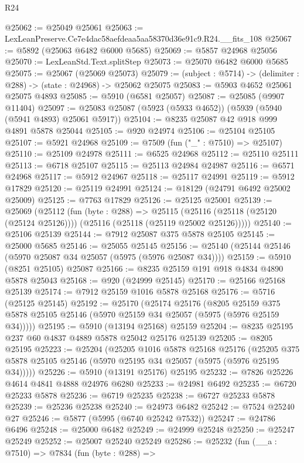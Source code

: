 \begin{lexlean}{R24}
\begin{coremodule}
@25062 := @25049 @25061
@25063 := LexLeanPreserve.Ce7e4dac58aefdeaa5aa58370d36e91c9.R24.__fits_108
@25067 := @5892 (@25063 @6482 @6000 @5685)
@25069 := @5857 @24968 @25056
@25070 := LexLeanStd.Text.splitStep
@25073 := @25070 @6482 @6000 @5685
@25075 := @25067 (@25069 @25073)
@25079 := (subject : @5714) -> (delimiter : @288) -> (state : @24968) -> @25062 @25075
@25083 := @5903 @4652 @25061 @25075 @4893
@25085 := @5910 (@6581 @25057)
@25087 := @25085 (@9907 @11404)
@25097 := @25083 @25087 (@5923 (@5933 @4652)) (@5939 (@5940 (@5941 @4893) @25061 @5917))
@25104 := @8235 @25087 @42 @918 @999 @4891 @5878 @25044
@25105 := @920 @24974
@25106 := @25104 @25105
@25107 := @5921 @24968
@25109 := @7509 (fun ("_" : @7510) => @25107)
@25110 := @25109 @24978
@25111 := @6525 @24968
@25112 := @25110 @25111
@25113 := @6718 @25107
@25115 := @25113 @24984 @24987
@25116 := @6571 @24968
@25117 := @5912 @24967
@25118 := @25117 @24991
@25119 := @5912 @17829
@25120 := @25119 @24991
@25124 := @18129 (@24791 @6492 @25002 @25009)
@25125 := @7763 @17829
@25126 := @25125 @25001
@25139 := @25069
    (@25112
      (fun (byte : @288) =>
      @25115 (@25116 (@25118 (@25120 (@25124 @25126)))) (@25116 (@25118 (@25119 @25002 @25126)))))
@25140 := @25106 @25139
@25144 := @7912 @25087 @375 @5878 @25105
@25145 := @25000 @5685
@25146 := @25055 @25145
@25156 := @25140 (@25144 @25146 (@5970 @25087 @34 @25057 (@5975 (@5976 @25087 @34))))
@25159 := @5910 (@8251 @25105) @25087
@25166 := @8235 @25159 @191 @918 @4834 @4890 @5878 @25043
@25168 := @920 (@24999 @25145)
@25170 := @25166 @25168 @25139
@25174 := @7912 @25159 @1016 @5878 @25168
@25176 := @5716 (@25125 @25145)
@25192 := @25170
    (@25174
      @25176
      (@8205 @25159 @375 @5878 @25105 @25146 (@5970 @25159 @34 @25057 (@5975 (@5976 @25159 @34)))))
@25195 := @5910 (@13194 @25168) @25159
@25204 := @8235 @25195 @237 @60 @4837 @4889 @5878 @25042 @25176 @25139
@25205 := @8205 @25195
@25223 := @25204
    (@25205
      @1016
      @5878
      @25168
      @25176
      (@25205 @375 @5878 @25105 @25146 (@5970 @25195 @34 @25057 (@5975 (@5976 @25195 @34)))))
@25226 := @5910 (@13191 @25176) @25195
@25232 := @7826 @25226 @4614 @4841 @4888 @24976 @6280
@25233 := @24981 @6492
@25235 := @6720 @25233 @5878
@25236 := @6719 @25235
@25238 := @6727 @25233 @5878
@25239 := @25236 @25238
@25240 := @24973 @6482
@25242 := @7524 @25240 @27
@25246 := @5877 (@5995 (@6740 @25242 @7532))
@25247 := @24786 @6496
@25248 := @25000 @6482
@25249 := @24999 @25248
@25250 := @25247 @25249
@25252 := @25007 @25240 @25249
@25286 := @25232
    (fun (__a : @7510) =>
    @7834
      (fun (byte : @288) =>

\end{coremodule}
\end{lexlean}
